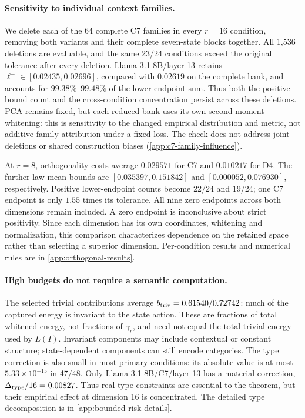 \paragraph{Sensitivity to individual context families.}
We delete each of the 64 complete C7 families in every $r=16$ condition, removing both variants and their complete seven-state blocks together. All 1,536 deletions are evaluable, and the same 23/24 conditions exceed the original tolerance after every deletion. Llama-3.1-8B/layer 13 retains $\ell^-\in[0.02435,0.02696]$, compared with $0.02619$ on the complete bank, and accounts for $99.38\%$--$99.48\%$ of the lower-endpoint sum. Thus both the positive-bound count and the cross-condition concentration persist across these deletions. PCA remains fixed, but each reduced bank uses its own second-moment whitening: this is sensitivity to the changed empirical distribution and metric, not additive family attribution under a fixed loss. The check does not address joint deletions or shared construction biases (\cref{app:c7-family-influence}).

At $r=8$, orthogonality costs average $0.029571$ for C7 and $0.010217$ for D4. The further-law mean bounds are $[0.035397,0.151842]$ and $[0.000052,0.076930]$, respectively. Positive lower-endpoint counts become 22/24 and 19/24; one C7 endpoint is only $1.55$ times its tolerance. All nine zero endpoints across both dimensions remain included. A zero endpoint is inconclusive about strict positivity. Since each dimension has its own coordinates, whitening and normalization, this comparison characterizes dependence on the retained space rather than selecting a superior dimension. Per-condition results and numerical rules are in \cref{app:orthogonal-results}.

\paragraph{High budgets do not require a semantic computation.}
The selected trivial contributions average $b_{\rm triv}=0.61540/0.72742$: much of the captured energy is invariant to the state action. These are fractions of total whitened energy, not fractions of $\gamma_r$, and need not equal the total trivial energy used by $L(I)$. Invariant components may include contextual or constant structure; state-dependent components can still encode categories. The type correction is also small in most primary conditions: its absolute value is at most $5.33\times10^{-15}$ in 47/48. Only Llama-3.1-8B/C7/layer 13 has a material correction, $\Delta_{\rm type}/16=0.00827$. Thus real-type constraints are essential to the theorem, but their empirical effect at dimension 16 is concentrated. The detailed type decomposition is in \cref{app:bounded-risk-details}.

